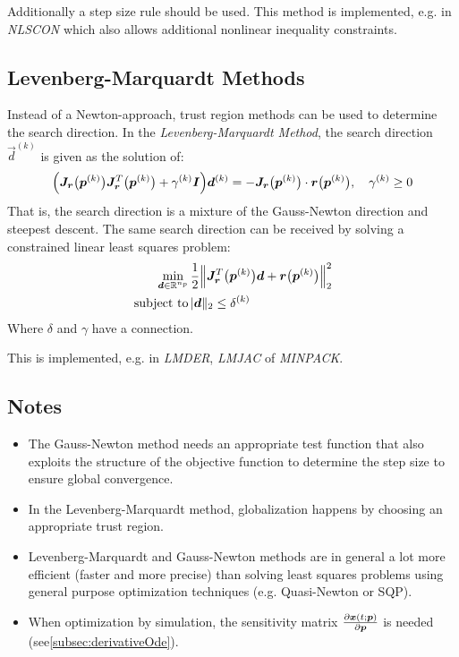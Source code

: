 			Additionally a step size rule should be used. This method is implemented, e.g. in \emph{NLSCON} which also allows additional nonlinear inequality constraints.

		\subsection{Levenberg-Marquardt Methods}
			Instead of a Newton-approach, trust region methods can be used to determine the search direction. In the \emph{Levenberg-Marquardt Method}, the search direction \(\vec{d}^{(k)}\) is given as the solution of:
			\begin{align*}
				\Big( \bm{J}_{\bm{r}}\big(\bm{p}^{(k)}\big) \bm{J}_{\bm{r}}^T\big(\bm{p}^{(k)}\big) + \gamma^{(k)} \bm{I} \Big) \bm{d}^{(k)} = -\bm{J}_{\bm{r}}\big(\bm{p}^{(k)}\big) \cdot \bm{r}\big(\bm{p}^{(k)}\big),\quad \gamma^{(k)} \geq 0
			\end{align*}
			That is, the search direction is a mixture of the Gauss-Newton direction and steepest descent. The same search direction can be received by solving a constrained linear least squares problem:
			\begin{align*}
				\min_{\bm{d} \in \mathbb{R}^{n_p}} &\, \frac{1}{2} \Big\lVert \bm{J}_{\bm{r}}^T\big(\bm{p}^{(k)}\big) \bm{d} + \bm{r}\big(\bm{p}^{(k)}\big) \Big\rVert_2^2 \\
				\mathrm{subject~to} &\,
					\lvert \bm{d} \rVert_2 \leq \delta^{(k)}
			\end{align*}
			Where \(\delta\) and \(\gamma\) have a connection.

			This is implemented, e.g. in \emph{LMDER}, \emph{LMJAC} of \emph{MINPACK}.

		\subsection{Notes}
			\begin{itemize}
				\item The Gauss-Newton method needs an appropriate test function that also exploits the structure of the objective function to determine the step size to ensure global convergence.
				\item In the Levenberg-Marquardt method, globalization happens by choosing an appropriate trust region.
				\item Levenberg-Marquardt and Gauss-Newton methods are in general a lot more efficient (faster and more precise) than solving least squares problems using general purpose optimization techniques (e.g. Quasi-Newton or SQP).
				\item When optimization by simulation, the sensitivity matrix \( \pdv{\bm{x}(t; \bm{p})}{\bm{p}} \) is needed (see\autoref{subsec:derivativeOde}).
			\end{itemize}

